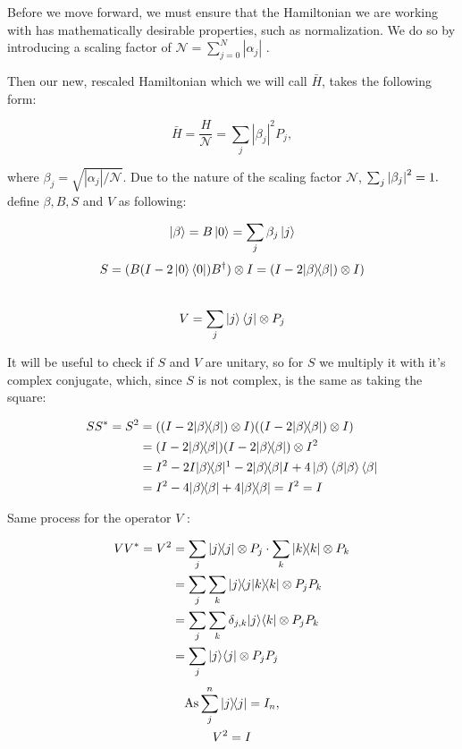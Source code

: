 Before we move forward, we must ensure that the Hamiltonian we are working with has mathematically desirable properties, such as normalization. We do so by introducing a scaling factor of $\mathcal{N} = \sum_{j=0}^N |\alpha_j|$ \cite{poulin}.

Then our new, rescaled Hamiltonian which we will call $\bar{H}$, takes the following form:

\begin{equation}
	\bar H = \frac H{\mathcal{N}} = \sum_j|\beta_j|^2 P_j,
\end{equation}

where $\beta_j = \sqrt{|\alpha_j|/\mathcal{N}}$. Due to the nature of the scaling factor $\mathcal{N}$, $\sum_j \abs{\beta_j}^2 = 1.$
\\\textcite{poulin} define $\beta, B, S$ and  $V$ as following:

$$
\left\vert{\beta}\right\rangle = B\left\vert{0}\right\rangle = \sum_j \beta_j \left\vert{j}\right\rangle$$
$$
S = (B (I - 2 \left\vert{0}\right\rangle\left\langle{0}\right\vert) B^{\dagger}) \otimes I= (I-2| \beta \rangle\!\langle \beta |) \otimes I)$$
\\
$$
V=\sum_{j}\left\vert{j}\right\rangle\left\langle{j}\right\vert \otimes P_{j}
$$

It will be useful to check if $S$ and $V$ are unitary, so for $S$ we multiply it with it's complex conjugate, which, since $S$ is not complex, is the same as taking the square:

\begin{align*}
SS^* = S^2 &= ((I-2\kb \beta \beta) \otimes I)((I-2\kb \beta \beta) \otimes I)\\
&= (I-2\kb \beta \beta)(I-2\kb \beta \beta) \otimes I^2 \\
&= I^2 - 2I\kb \beta \beta\footnotemark - 2\kb \beta \beta I + 4 \ket{\beta} \bracket \beta \beta \bra \beta\\
&= I^2 - 4\kb \beta \beta + 4\kb \beta \beta = I^2 = I
\end{align*}



Same process for the operator $ V$  :

\begin{align*}
VV^* = V^2 &= \sum_{j} | j \rangle\!\langle j | \otimes P_{j} \cdot \sum_{k} | k \rangle\!\langle k | \otimes P_{k} \\
&= \sum_j \sum_k |j \rangle\!\langle j | k \rangle\!\langle k | \otimes P_j P_k\\
&= \sum_j \sum_k \delta_{j,k} | j \rangle \langle k | \otimes P_j P_k\\
&= \sum_j | j \rangle \langle j | \otimes P_j P_j\\
\end{align*}
\begin{gather*}
\text{As}  \sum_{j}^{n} | j \rangle\!\langle j | = I_n, \\
V^2 = I
\end{gather*}


